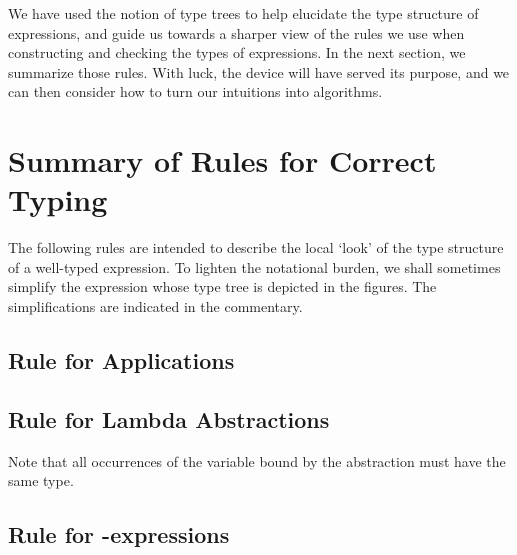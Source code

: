 We have used the notion of type trees to help elucidate the type structure of
expressions, and guide us towards a sharper view of the rules we use when
constructing and checking the types of expressions. In the next section, we
summarize those rules. With luck, the device will have served its purpose, and
we can then consider how to turn our intuitions into algorithms.

\section{Summary of Rules for Correct Typing}

The following rules are intended to describe the local `look' of the type
structure of a well-typed expression. To lighten the notational burden, we
shall sometimes simplify the expression whose type tree is depicted in the
figures. The simplifications are indicated in the commentary.

\subsection{Rule for Applications}


\subsection{Rule for Lambda Abstractions}

\noindent
Note that all occurrences of the variable  bound by the abstraction must have
the same type.

\subsection{Rule for -expressions}

